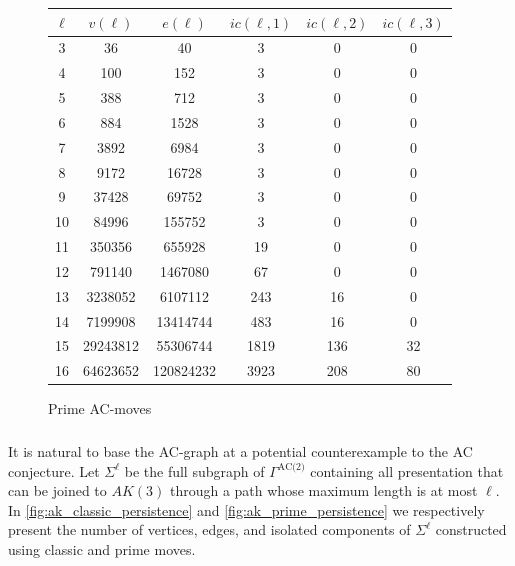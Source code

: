 \begin{figure}
	\begin{tabular}{|c|c|c|c|c|c|}
		\hline
		$\ell$ & $v(\ell)$ & $e(\ell)$ & $ic(\ell,1)$ & $ic(\ell,2)$ & $ic(\ell,3)$ \\ \hline
		3 & 36 & 40 & 3 & 0 & 0 \\ \hline
		4 & 100 & 152 & 3 & 0 & 0 \\ \hline
		5 & 388 & 712 & 3 & 0 & 0 \\ \hline
		6 & 884 & 1528 & 3 & 0 & 0 \\ \hline
		7 & 3892 & 6984 & 3 & 0 & 0 \\ \hline
		8 & 9172 & 16728 & 3 & 0 & 0 \\ \hline
		9 & 37428 & 69752 & 3 & 0 & 0 \\ \hline
		10 & 84996 & 155752 & 3 & 0 & 0 \\ \hline
		11 & 350356 & 655928 & 19 & 0 & 0 \\ \hline
		12 & 791140 & 1467080 & 67 & 0 & 0 \\ \hline
		13 & 3238052 & 6107112 & 243 & 16 & 0 \\ \hline
		14 & 7199908 & 13414744 & 483 & 16 & 0 \\ \hline
		15 & 29243812 & 55306744 & 1819 & 136 & 32 \\ \hline
		16 & 64623652 & 120824232 & 3923 & 208 & 80 \\ \hline
	\end{tabular}
	\caption{Prime AC-moves}
	\label{fig:prime_persistence}
\end{figure}

\subsubsection{}

It is natural to base the AC-graph at a potential counterexample to the AC conjecture.
Let \(\Sigma^\ell\) be the full subgraph of \(\Gamma^{\text{AC(2)}}\) containing all presentation that can be joined to \(AK(3)\) through a path whose maximum length is at most \(\ell\).
In \cref{fig:ak_classic_persistence} and \cref{fig:ak_prime_persistence} we respectively present the number of vertices, edges, and isolated components of \(\Sigma^\ell\) constructed using classic and prime moves.

